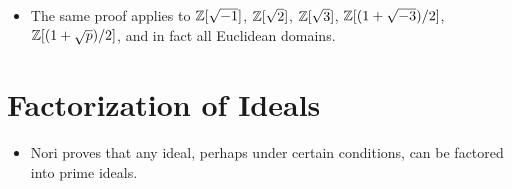 \documentclass[../notes.tex]{subfiles}
\begin{document}
\begin{itemize}
\begin{proof}
        It follows that $g\in\Z[\sqrt{-1}]$ equals $qf+(fc)$, where $qf\in\Z[\sqrt{-1}]$ and $fc=r\in\Z[\sqrt{-1}]$. Moreover, $N(r)=N(f)N(c)\leq 1/2N(f)$.
    \end{proof}
    \item The same proof applies to $\mathbb{Z}[\sqrt{-1}]$, $\mathbb{Z}[\sqrt{2}]$, $\mathbb{Z}[\sqrt{3}]$, $\mathbb{Z}[(1+\sqrt{-3})/2]$, $\mathbb{Z}[(1+\sqrt{p})/2]$, and in fact all Euclidean domains.
\end{itemize}



\section{Factorization of Ideals}
\begin{itemize}
    \item {}Nori proves that any ideal, perhaps under certain conditions, can be factored into prime ideals.
\end{itemize}
\end{document}
